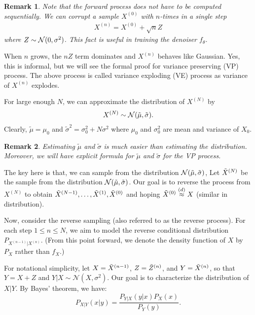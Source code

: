 \documentclass[11pt, a4paper]{article}
\newtheorem{remark}{Remark}
\begin{document}
\begin{remark}
    Note that the forward process does not have to be computed sequentially.
    We can corrupt a sample $X^{(0)}$ with $n$-times in a single step
    \begin{align}
        X^{(n)} = X^{(0)} + \sqrt{n} Z
    \end{align}
    where $Z\sim{\cal N}(0, \sigma^2)$.
    This fact is useful in training the denoiser $f_\theta$.
\end{remark}

When $n$ grows, the $nZ$ term dominates and $X^{(n)}$ behaves like Gaussian.
Yes, this is informal, but we will see the formal proof for variance preserving (VP) process.
The above process is called variance exploding (VE) process as variance of $X^{(n)}$ explodes.

For large enough $N$, we can approximate the distribution of $X^{(N)}$ by
\begin{align}
    X^{(N)} \sim {\cal N}(\tilde{\mu}, \tilde{\sigma}).
\end{align}
Clearly, $\tilde{\mu} = \mu_0$ and $\tilde{\sigma}^2 = \sigma_0^2 + N\sigma^2$ where $\mu_0$ and $\sigma_0^2$ are mean and variance of $X_0$.

\begin{remark}
Estimating $\tilde{\mu}$ and $\tilde{\sigma}$ is much easier than estimating the distribution.
Moreover, we will have explicit formula for $\tilde{\mu}$ and $\tilde{\sigma}$ for the VP process.
\end{remark}

The key here is that, we can sample from the distribution ${\cal N}(\tilde{\mu}, \tilde{\sigma})$,
Let $\tilde{X}^{(N)}$ be the sample from the distribution ${\cal N}(\tilde{\mu}, \tilde{\sigma})$.
Our goal is to reverse the process from $X^{(N)}$ to obtain $\tilde{X}^{(N-1)}, \dots, \tilde{X}^{(1)}, \tilde{X}^{(0)}$ 
and hoping $\tilde{X}^{(0)} \stackrel{(d)}{\approx} X$ (similar in distribution).

Now, consider the reverse sampling (also referred to as the reverse process).  
For each step \( 1 \leq n \leq N \), we aim to model the reverse conditional distribution \( P_{X^{(n-1)}|X^{(n)}} \). (From this point forward, we denote the density function of \( X \) by \( P_X \) rather than \( f_X \).)  

For notational simplicity, let \( X = \tilde{X}^{(n-1)} \), \( Z = \tilde{Z}^{(n)} \), and \( Y = \tilde{X}^{(n)} \), so that \( Y = X + Z \) and \( Y|X \sim \mathcal{N}(X, \sigma^2) \).  
Our goal is to characterize the distribution of \( X|Y \).  
By Bayes' theorem, we have:
\[
P_{X|Y}(x|y) = \frac{P_{Y|X}(y|x) P_X(x)}{P_Y(y)}.
\]
\end{document}
